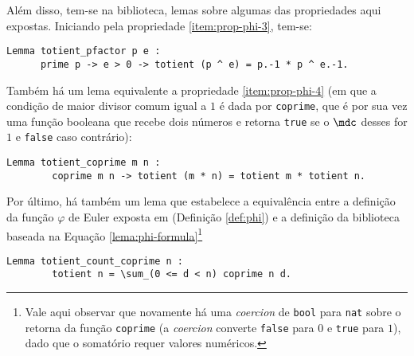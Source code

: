 Além disso, tem-se na biblioteca, lemas sobre algumas das propriedades aqui expostas. Iniciando pela propriedade \ref{item:prop-phi-3}, tem-se:
\begin{lstlisting}[language = coq]
    Lemma totient_pfactor p e :
      prime p -> e > 0 -> totient (p ^ e) = p.-1 * p ^ e.-1.
\end{lstlisting}
Também há um lema equivalente a propriedade \ref{item:prop-phi-4} (em que a condição de maior divisor comum igual a $1$ é dada por \lstinline[language = coq]{coprime}, que é por sua vez uma função booleana que recebe dois números e retorna \lstinline[language = coq]{true} se o $\mdc$ desses for $1$ e \lstinline[language = coq]{false} caso contrário):
\begin{lstlisting}[language = coq]
    Lemma totient_coprime m n :
        coprime m n -> totient (m * n) = totient m * totient n.
\end{lstlisting}
Por último, há também um lema que estabelece a equivalência entre a definição da função $\varphi$ de Euler exposta em \cite{book:2399854} (Definição \ref{def:phi}) e a definição da biblioteca baseada na Equação \ref{lema:phi-formula}\footnote{Vale aqui observar que novamente há uma \textit{coercion} de \lstinline[language = coq]{bool} para \lstinline[language = coq]{nat} sobre o retorna da função \lstinline[language = coq]{coprime} (a \textit{coercion} converte \lstinline[language = coq]{false} para $0$ e \lstinline[language = coq]{true} para $1$), dado que o somatório requer valores numéricos.}%
\begin{lstlisting}[language = coq]
    Lemma totient_count_coprime n : 
        totient n = \sum_(0 <= d < n) coprime n d.
\end{lstlisting} 

